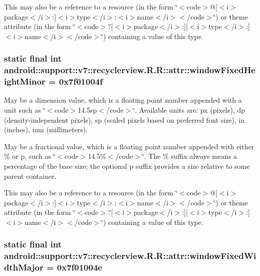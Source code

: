 This may also be a reference to a resource (in the form \char`\"{}$<$code$>$@\mbox{[}$<$i$>$package$<$/i$>$:\mbox{]}$<$i$>$type$<$/i$>$:$<$i$>$name$<$/i$>$$<$/code$>$\char`\"{}) or theme attribute (in the form \char`\"{}$<$code$>$?\mbox{[}$<$i$>$package$<$/i$>$:\mbox{]}\mbox{[}$<$i$>$type$<$/i$>$:\mbox{]}$<$i$>$name$<$/i$>$$<$/code$>$\char`\"{}) containing a value of this type. \hypertarget{classandroid_1_1support_1_1v7_1_1recyclerview_1_1_r_1_1attr_d0be12419b88834c4de5eeeedbce14c9}{
\subsubsection[{windowFixedHeightMinor}]{\setlength{\rightskip}{0pt plus 5cm}static final int android::support::v7::recyclerview.R.R::attr::windowFixedHeightMinor = 0x7f01004f}}
\label{classandroid_1_1support_1_1v7_1_1recyclerview_1_1_r_1_1attr_d0be12419b88834c4de5eeeedbce14c9}


May be a dimension value, which is a floating point number appended with a unit such as \char`\"{}$<$code$>$14.5sp$<$/code$>$\char`\"{}. Available units are: px (pixels), dp (density-independent pixels), sp (scaled pixels based on preferred font size), in (inches), mm (millimeters). 

May be a fractional value, which is a floating point number appended with either \% or p, such as \char`\"{}$<$code$>$14.5\%$<$/code$>$\char`\"{}. The \% suffix always means a percentage of the base size; the optional p suffix provides a size relative to some parent container. 

This may also be a reference to a resource (in the form \char`\"{}$<$code$>$@\mbox{[}$<$i$>$package$<$/i$>$:\mbox{]}$<$i$>$type$<$/i$>$:$<$i$>$name$<$/i$>$$<$/code$>$\char`\"{}) or theme attribute (in the form \char`\"{}$<$code$>$?\mbox{[}$<$i$>$package$<$/i$>$:\mbox{]}\mbox{[}$<$i$>$type$<$/i$>$:\mbox{]}$<$i$>$name$<$/i$>$$<$/code$>$\char`\"{}) containing a value of this type. \hypertarget{classandroid_1_1support_1_1v7_1_1recyclerview_1_1_r_1_1attr_6b4523c344e7065595bdd942c6365a79}{
\subsubsection[{windowFixedWidthMajor}]{\setlength{\rightskip}{0pt plus 5cm}static final int android::support::v7::recyclerview.R.R::attr::windowFixedWidthMajor = 0x7f01004e}}
\label{classandroid_1_1support_1_1v7_1_1recyclerview_1_1_r_1_1attr_6b4523c344e7065595bdd942c6365a79}


